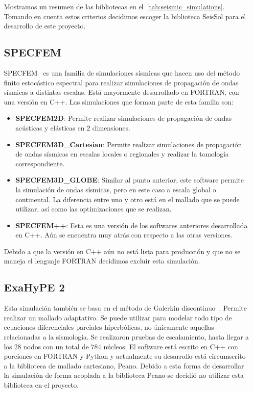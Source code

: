 Mostramos un resumen de las bibliotecas en el~\cref{tab:seismic_simulations}. Tomando en cuenta estos criterios decidimos escoger la biblioteca SeisSol para el desarrollo de este proyecto.

\subsection{SPECFEM}
SPECFEM~\cite{Peter_Forward_and_adjoint_2011} es una familia de simulaciones sísmicas que hacen uso del método finito estocástico espectral para realizar simulaciones de propagación de ondas sísmicas a distintas escalas. Está mayormente desarrollado en FORTRAN, con una versión en C++.
Las simulaciones que forman parte de esta familia son:
\begin{itemize}
  \item \textbf{SPECFEM2D}: Permite realizar simulaciones de propagación de ondas acústicas y elásticas en 2 dimensiones.
  \item \textbf{SPECFEM3D\_Cartesian}: Permite realizar simulaciones de propagación de ondas sísmicas en escalas locales o regionales y realizar la tomología correspondiente.
  \item \textbf{SPECFEM3D\_GLOBE}: Similar al punto anterior, este software permite la simulación de ondas sísmicas, pero en este caso a escala global o continental. La diferencia entre uno y otro está en el mallado que se puede utilizar, así como las optimizaciones que se realizan.
  \item \textbf{SPECFEM++}: Esta es una versión de los softwares anteriores desarrollada en C++. Aún se encuentra muy atrás con respecto a las otras versiones.\end{itemize}

Debido a que la versión en C++ aún no está lista para producción y que no se maneja el lenguaje FORTRAN decidimos excluir esta simulación.

\subsection{ExaHyPE 2}
Esta simulación también se basa en el método de Galerkin discontinuo~\cite{Reinarz2020}. Permite realizar un mallado adaptativo. Se puede utilizar para modelar todo tipo de ecuaciones diferenciales parciales hiperbólicas, no únicamente aquellas relacionadas a la sismología. Se realizaron pruebas de escalamiento, hasta llegar a los 28 nodos con un total de 784 núcleos. El software está escrito en C++ con porciones en FORTRAN y Python y actualmente su desarrollo está circumscrito a la biblioteca de mallado cartesiano, Peano. Debido a esta forma de desarrollar la simulación de forma acoplada a la biblioteca Peano se decidió no utilizar esta biblioteca en el proyecto.

